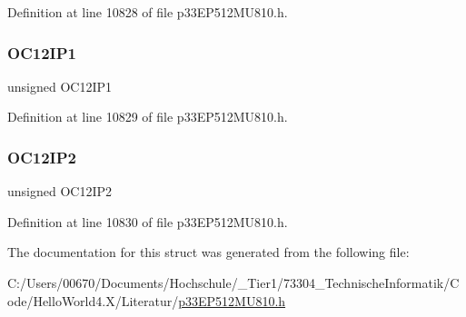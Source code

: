 Definition at line 10828 of file p33\+E\+P512\+M\+U810.\+h.

\mbox{\label{structtag_i_p_c32_b_i_t_s_a83bf1c2a320143a351bfb4630cbf9dcd}} 
\subsubsection{\texorpdfstring{O\+C12\+I\+P1}{OC12IP1}}
{\footnotesize\ttfamily unsigned O\+C12\+I\+P1}



Definition at line 10829 of file p33\+E\+P512\+M\+U810.\+h.

\mbox{\label{structtag_i_p_c32_b_i_t_s_a7f77562cf72445f2b56fbbbc5a5cf5a5}} 
\subsubsection{\texorpdfstring{O\+C12\+I\+P2}{OC12IP2}}
{\footnotesize\ttfamily unsigned O\+C12\+I\+P2}



Definition at line 10830 of file p33\+E\+P512\+M\+U810.\+h.



The documentation for this struct was generated from the following file\+:\begin{DoxyCompactItemize}
\item 
C\+:/\+Users/00670/\+Documents/\+Hochschule/\+\_\+\+Tier1/73304\+\_\+\+Technische\+Informatik/\+Code/\+Hello\+World4.\+X/\+Literatur/\hyperlink{p33_e_p512_m_u810_8h}{p33\+E\+P512\+M\+U810.\+h}\end{DoxyCompactItemize}
